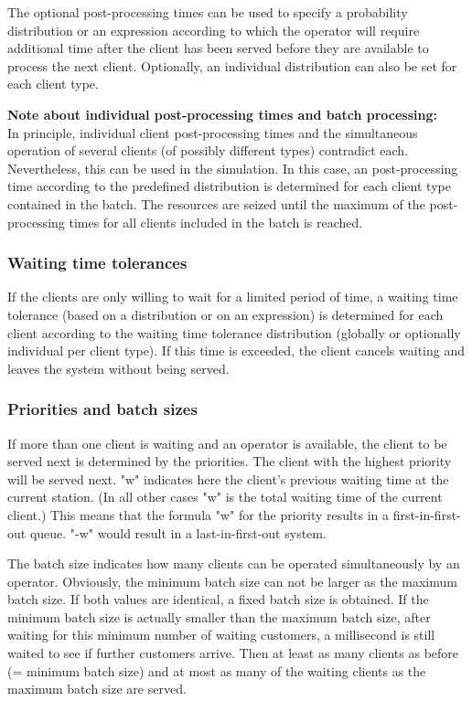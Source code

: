 The optional post-processing times can be used to specify a probability distribution or an expression
according to which the operator will require additional time after the client has been served before they are
available to process the next client. Optionally, an individual distribution can also be set
for each client type.

\textbf{Note about individual post-processing times and batch processing:}~\\
In principle, individual client post-processing times and the simultaneous operation of several clients
(of possibly different types) contradict each. Nevertheless, this can be used in the simulation.
In this case, an post-processing time according to the predefined distribution is determined for each
client type contained in the batch. The resources are seized until the maximum of the post-processing times
for all clients included in the batch is reached.

\subsubsection*{Waiting time tolerances}

If the clients are only willing to wait for a limited period of time, a waiting time tolerance (based on a distribution
or on an expression) is determined for each client according to the waiting time tolerance distribution
(globally or optionally individual per client type). If this time is exceeded, the client cancels waiting and leaves
the system without being served.

\subsubsection*{Priorities and batch sizes}

If more than one client is waiting and an operator is available, the client to be served next is determined by the 
priorities. The client with the highest priority will be served next. 
"w" indicates here the client's previous waiting time at the current station. (In all other cases "w" is the total
waiting time of the current client.) This means that the formula "w" for the priority results
in a first-in-first-out queue. "-w" would result in a last-in-first-out system.

The batch size indicates how many clients can be operated simultaneously by an operator. Obviously, the minimum batch
size can not be larger as the maximum batch size. If both values are identical, a fixed batch size is obtained.
If the minimum batch size is actually smaller than the maximum batch size, after waiting for this minimum number of
waiting customers, a millisecond is still waited to see if further customers arrive. Then at least as many clients
as before (= minimum batch size) and at most as many of the waiting clients as the maximum batch size are served.

